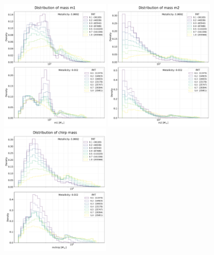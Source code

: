 \documentclass[prb,twocolumn,9pt]{revtex4-1}
\begin{document}
\begin{figure}[htp]
    \centering 
    \includegraphics[width=0.49\textwidth]{images/assignment1/hist_mass_1.pdf}
    \hskip 1mm
   \includegraphics[width=0.49\textwidth]{images/assignment1/hist_mass_2.pdf}
    \\
    \vskip 0.7cm
    \includegraphics[width=0.49\textwidth]{images/assignment1/hist_mass_chirp.pdf}

\end{figure}
\end{document}
